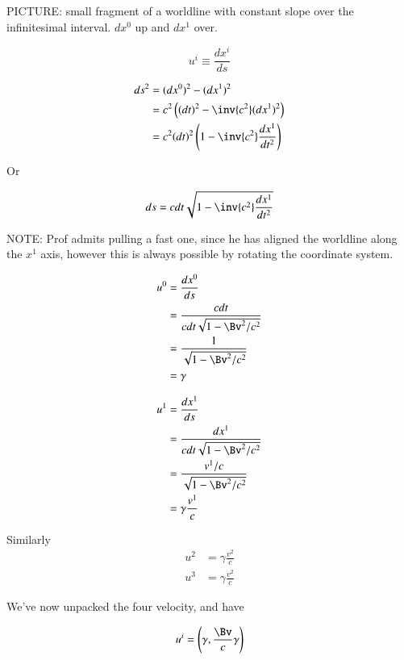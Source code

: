PICTURE: small fragment of a worldline with constant slope over the infinitesimal interval.  $dx^0$ up and $dx^1$ over.

\begin{equation}\label{eqn:relativisticElectrodynamicsL7:70}
u^i \equiv \frac{dx^i}{ds}
\end{equation}

\begin{align*}
ds^2 
&= (dx^0)^2 - (dx^1)^2 \\
&= c^2 \left( (dt)^2 - \inv{c^2} (dx^1)^2 \right) \\
&= c^2 (dt)^2 \left( 1 - \inv{c^2} \frac{dx^1}{dt^2} \right) 
\end{align*}

Or 

\begin{align}\label{eqn:relativisticElectrodynamicsL7:90}
ds = c dt \sqrt{1 - \inv{c^2} \frac{dx^1}{dt^2} }
\end{align}

NOTE: Prof admits pulling a fast one, since he has aligned the worldline along the $x^1$ axis, however this is always possible by rotating the coordinate system.

\begin{align*}
u^0 
&= \frac{dx^0}{ds} \\
&= \frac{c dt}{ c dt \sqrt{ 1 - \Bv^2/c^2} } \\
&= \frac{1}{ \sqrt{ 1 - \Bv^2/c^2} } \\
&= \gamma
\end{align*}

\begin{align*}
u^1 
&= \frac{dx^1}{ds} \\
&= \frac{dx^1 }{ c dt \sqrt{ 1 - \Bv^2/c^2} } \\
&= \frac{v^1/c}{ \sqrt{ 1 - \Bv^2/c^2} } \\
&= \gamma \frac{v^1}{c}
\end{align*}

Similarly
\begin{align*}
u^2 &= \gamma \frac{v^2}{c} \\
u^3 &= \gamma \frac{v^2}{c}
\end{align*}

We've now unpacked the four velocity, and have

\begin{equation}\label{eqn:relativisticElectrodynamicsL7:100}
u^i = \left( \gamma, \frac{\Bv}{c} \gamma \right)
\end{equation}

